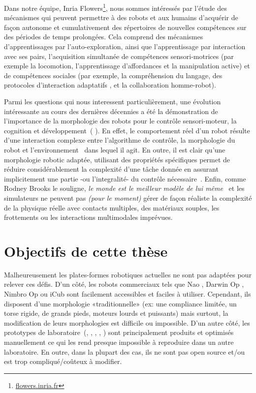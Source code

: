 Dans notre équipe, Inria Flowers\footnote{\url{flowers.inria.fr}}, nous sommes intéressés par l'étude des mécanismes qui peuvent permettre à des robots et aux humains d'acquérir de façon autonome et cumulativement des répertoires de nouvelles compétences sur des périodes de temps prolongées. Cela comprend des mécanismes d'apprentissages par l'auto-exploration, ainsi que l'apprentissage par interaction avec ses pairs, l'acquisition simultanée de compétences sensori-motrices (par exemple la locomotion, l'apprentissage d'affordances et la manipulation active) et de compétences sociales (par exemple, la compréhension du langage, des protocoles d'interaction adaptatifs , et la collaboration homme-robot).

Parmi les questions qui nous interessent particulièrement, une évolution intéressante au cours des dernières décennies a été la démonstration de l'importance de la morphologie des robots pour le contrôle sensori-moteur, la cognition et développement~(\cite{kaplan2008corps} \cite{steels1995artificial} \cite{Pfeifer06}). En effet, le comportement réel d'un robot résulte d'une interaction complexe entre l'algorithme de contrôle, la morphologie du robot et l'environnement~\parencite{Steels1991emergence} dans lequel il agit. En outre, il est clair qu’une morphologie  robotic adaptée, utilisant des propriétés spécifiques permet de réduire considérablement la complexité d'une tâche donnée en assurant implicitement une partie -ou l’integralité- du contrôle nécessaire~\parencite{pfeifer2005morphological}.
Enfin, comme Rodney Brooks le souligne, \emph{le monde est le meilleur modèle de lui même}~\parencite{brooks1991intelligence} et les simulateurs ne peuvent pas \emph{(pour le moment)} gérer de façon réaliste la complexité de la physique réelle avec contacts multiples, des matériaux souples, les frottements ou les interactions multimodales imprévues.


\section*{Objectifs de cette thèse} %

Malheureusement les plates-formes robotiques actuelles ne sont pas adaptées pour relever ces défis. D'un côté, les robots commerciaux tels que Nao \parencite{gouaillier2008nao}, Darwin Op \parencite{ha2011development}, Nimbro Op \parencite{schwarznimbro} ou iCub \parencite{metta2008icub} sont facilement accessibles et faciles à utiliser. Cependant, ils disposent d’une morphologie «traditionnelle» (ex: une compliance limitée, un torse rigide, de grands pieds, moteurs lourds et puissants) mais surtout, la modification de leurs morphologies est difficile ou impossible.
D’un autre côté, les prototypes de laboratoire~(\cite{wisse2007passive}, \cite{nakanishi2013design}, \cite{ly2011bio}, \cite{niiyama2010athlete}, \cite{radkhah2011concept}) sont principalement produits et optimisés manuellement ce qui les rend presque impossible à reproduire dans un autre laboratoire. En outre, dans la plupart des cas, ils ne sont pas open source et/ou est trop compliqué/coûteux à modifier.

